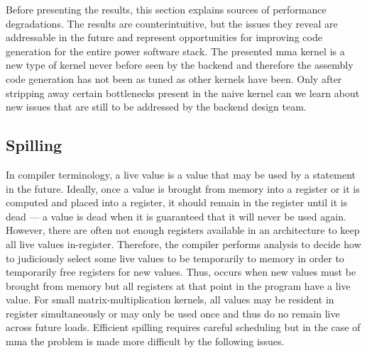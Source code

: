 \documentclass[\main/thesis.tex]{subfiles}
\begin{document}
Before presenting the results, this section explains sources of performance degradations.
The results are counterintuitive, but the issues they reveal are addressable in the future and represent opportunities for improving code generation for the entire \gls{power} software stack.
The presented \gls{mma} kernel is a new type of kernel never before seen by the backend and therefore the assembly code generation has not been as tuned as other kernels have been.
Only after stripping away certain bottlenecks present in the naive kernel can we learn about new issues that are still to be addressed by the backend design team.

\subsection{Spilling}
In compiler terminology, a \gls{live} value is a value that may be used by a statement in the future.
Ideally, once a value is brought from memory into a register or it is computed and placed into a register, it should remain in the register until it is \gls{dead} --- a value is dead when it is guaranteed that it will never be used again.
However, there are often not enough registers available in an architecture to keep all live values in-register.
Therefore, the compiler performs analysis to decide how to judiciously select some live values to be temporarily  to memory in order to temporarily free registers for new values.
Thus,  occurs when new values must be brought from memory but all registers at that \gls{point} in the program have a \gls{live} value.
For small matrix-multiplication kernels, all values may be resident in register simultaneously or may only be used once and thus do no remain \gls{live} across future loads.
Efficient spilling requires careful scheduling but in the case of \gls{mma} the problem is made more difficult by the following issues.
\end{document}
